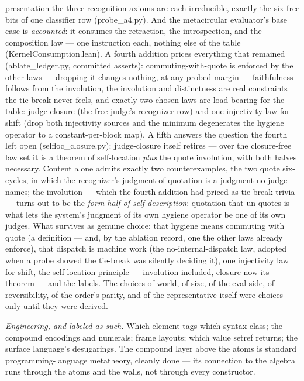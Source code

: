 \documentclass[acmsmall,screen,review]{acmart}
\begin{document}
presentation the three recognition axioms are each irreducible,
exactly the six free bits of one classifier row
(\textsf{probe\_a4.py}). And the metacircular evaluator's base case
is \emph{accounted}: it consumes the retraction, the introspection,
and the composition law --- one instruction each, nothing else of
the table (\textsf{KernelConsumption.lean}). A fourth addition prices
everything that remained (\textsf{ablate\_ledger.py}, committed
asserts): commuting-with-quote is enforced by the other laws ---
dropping it changes nothing, at any probed margin --- faithfulness
follows from the involution, the involution and distinctness are
real constraints the tie-break never feels, and exactly two chosen
laws are load-bearing for the table: judge-closure (the free judge's
recognizer row) and one injectivity law for shift (drop both
injectivity sources and the minimum degenerates the hygiene operator
to a constant-per-block map). A fifth answers the question the
fourth left open (\textsf{selfloc\_closure.py}): judge-closure
itself retires --- over the closure-free law set it is a theorem of
self-location \emph{plus} the quote involution, with both halves
necessary. Content alone admits exactly two counterexamples, the two
quote six-cycles, in which the recognizer's judgment of quotation is
a judgment no judge names; the involution --- which the fourth
addition had priced as tie-break trivia --- turns out to be the
\emph{form half of self-description}: quotation that un-quotes is
what lets the system's judgment of its own hygiene operator be one
of its own judges. What survives as
genuine choice: that hygiene means commuting with quote (a
definition --- and, by the ablation record, one the other laws
already enforce), that dispatch is machine work (the
no-internal-dispatch law, adopted when a probe showed the tie-break
was silently deciding it), one injectivity law for shift, the
self-location principle --- involution included, closure now its
theorem --- and the labels. The
choices of world, of size, of the eval side, of reversibility, of
the order's parity, and of the representative itself were choices
only until they were derived.

\emph{Engineering, and labeled as such.} Which element tags which
syntax class; the compound encodings and numerals; frame layouts;
which value \textsf{setref} returns; the surface language's
desugarings. The compound layer above the atoms is standard
programming-language metatheory, cleanly done --- its connection to
the algebra runs through the atoms and the walls, not through every
constructor.
\end{document}
